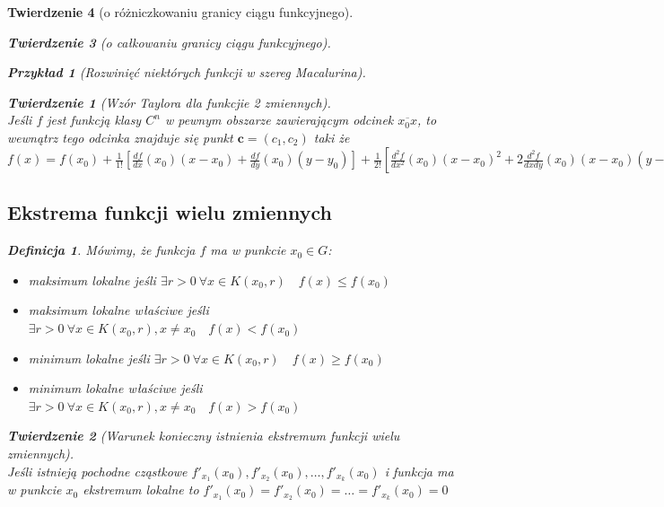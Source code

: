 \documentclass[12pt,a4paper]{article}
\newtheorem{tw}{Twierdzenie}
\newtheorem{przyklad}{Przykład}
\theoremstyle{definition}
\newtheorem{df}{Definicja}
\begin{document}
\begin{tw}[o różniczkowaniu granicy ciągu funkcyjnego]
\begin{tw}[o całkowaniu granicy ciągu funkcyjnego]
\begin{przyklad}[Rozwinięć niektórych funkcji w szereg Macalurina]
\begin{tw}[Wzór Taylora dla funkcjie 2 zmiennych]~\\
Jeśli $f$ jest funkcją klasy $C^n$ w pewnym obszarze zawierającym odcinek $\overline{x_0x}$, to wewnątrz  tego odcinka znajduje się punkt $\mathbf{c} = (c_1,c_2)$ taki że\\
$
f(x) = f(x_0) + \frac{1}{1!}\left[\frac{df}{dx}(x_0)(x-x_0) + \frac{df}{dy}(x_0)(y-y_0)\right] +
				\frac{1}{2!}\left[\frac{d^2f}{dx^2}(x_0)(x-x_0)^2 + 2\frac{d^2f}{dxdy}(x_0)(x-x_0)(y-y_0) + \frac{d^2f}{dy^2}(x_0)(y-y_0)^2\right]
				+ \dots + \frac{1}{(n-1)!}\sum\limits_{i=0}^{n-1}{n \choose i}\frac{d^nf}{dx^idy^j}(x_0)(x-x_0)^i(y-y_0)^{n-i-1} + R_n(x_0) \text{, gdzie } R_n(x_0) = \frac{1}{n!}\sum\limits_{i=0}^n {n \choose i}\frac{d^n}{dx^idY^{n-1}}(c)(x-x_0)^i(y-y_0)^{n-1}
$
\end{tw}

\subsection{Ekstrema funkcji wielu zmiennych}
\begin{df}
Mówimy, że funkcja $f$ ma w punkcie $x_0\in G$:\\
\begin{itemize}
	\item maksimum lokalne jeśli $\exists r>0 ~\forall x\in K(x_0,r) \quad f(x) \leqslant f(x_0)$
	\item maksimum lokalne właściwe jeśli $\exists r>0 ~\forall x\in K(x_0,r), x \neq x_0  \quad f(x) < f(x_0)$
	\item minimum lokalne jeśli $\exists r>0 ~\forall x\in K(x_0,r) \quad f(x) \geqslant f(x_0)$
	\item minimum lokalne właściwe jeśli $\exists r>0 ~\forall x\in K(x_0,r), x \neq x_0  \quad f(x) > f(x_0)$
\end{itemize}
\end{df}

\begin{tw}[Warunek konieczny istnienia ekstremum funkcji wielu zmiennych]~\\
Jeśli istnieją pochodne cząstkowe $f'_{x_1}(x_0), f'_{x_2}(x_0), \dots, f'_{x_k}(x_0)$ i funkcja ma w punkcie $x_0$ ekstremum lokalne to $f'_{x_1}(x_0) = f'_{x_2}(x_0) = \dots = f'_{x_k}(x_0) = 0$
\end{tw}


\end{przyklad}
\end{tw}
\end{tw}
\end{document}
